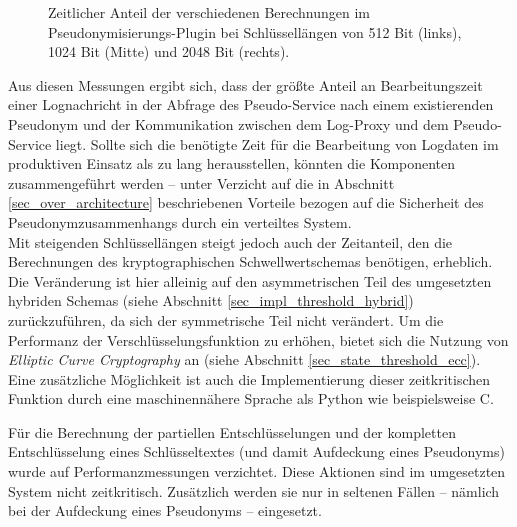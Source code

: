 \begin{figure}[]
    \centering
    \caption{Zeitlicher Anteil der verschiedenen Berechnungen im Pseudonymisierungs-Plugin bei  Schlüssellängen von 512 Bit (links), 1024 Bit (Mitte) und 2048 Bit (rechts).}
    \label{fig:eval_piecharts}
\end{figure}

Aus diesen Messungen ergibt sich, dass der größte Anteil an Bearbeitungszeit einer Lognachricht in der Abfrage des Pseudo-Service nach einem existierenden Pseudonym und der Kommunikation zwischen dem Log-Proxy und dem Pseudo-Service liegt. Sollte sich die benötigte Zeit für die Bearbeitung von Logdaten im produktiven Einsatz als zu lang herausstellen, könnten die Komponenten zusammengeführt werden -- unter Verzicht auf die in Abschnitt \ref{sec_over_architecture} beschriebenen Vorteile bezogen auf die Sicherheit des Pseudonymzusammenhangs durch ein verteiltes System.\\
Mit steigenden Schlüssellängen steigt jedoch auch der Zeitanteil, den die Berechnungen des kryptographischen Schwellwertschemas benötigen, erheblich. Die Veränderung ist hier alleinig auf den asymmetrischen Teil des umgesetzten hybriden Schemas (siehe Abschnitt \ref{sec_impl_threshold_hybrid}) zurückzuführen, da sich der symmetrische Teil nicht verändert. Um die Performanz der Verschlüsselungsfunktion zu erhöhen, bietet sich die Nutzung von \textit{Elliptic Curve Cryptography} an (siehe Abschnitt \ref{sec_state_threshold_ecc}). Eine zusätzliche Möglichkeit ist auch die Implementierung dieser zeitkritischen Funktion durch eine maschinennähere Sprache als Python wie beispielsweise C. 

Für die Berechnung der partiellen Entschlüsselungen und der kompletten Entschlüsselung eines Schlüsseltextes (und damit Aufdeckung eines Pseudonyms) wurde auf Performanzmessungen verzichtet. Diese Aktionen sind im umgesetzten System nicht zeitkritisch. Zusätzlich werden sie nur in seltenen Fällen -- nämlich bei der Aufdeckung eines Pseudonyms -- eingesetzt.

